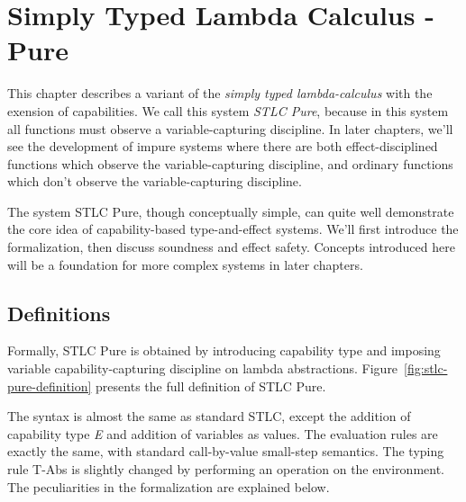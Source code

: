 \section{Simply Typed Lambda Calculus - Pure}

This chapter describes a variant of the \emph{simply typed
  lambda-calculus} with the exension of capabilities. We call this
system \emph{STLC Pure}, because in this system all functions must
observe a variable-capturing discipline.  In later chapters, we'll see
the development of impure systems where there are both
effect-disciplined functions which observe the variable-capturing
discipline, and ordinary functions which don't observe the
variable-capturing discipline.

The system STLC Pure, though conceptually simple, can quite well
demonstrate the core idea of capability-based type-and-effect
systems. We'll first introduce the formalization, then discuss
soundness and effect safety. Concepts introduced here will be a
foundation for more complex systems in later chapters.

\subsection{Definitions}

Formally, STLC Pure is obtained by introducing capability type and
imposing variable capability-capturing discipline on lambda
abstractions.  Figure~\ref{fig:stlc-pure-definition} presents the full
definition of STLC Pure.

The syntax is almost the same as standard STLC, except the addition of
capability type \emph{E} and addition of variables as values. The
evaluation rules are exactly the same, with standard call-by-value
small-step semantics. The typing rule T-Abs is slightly changed by
performing an operation on the environment. The peculiarities in the
formalization are explained below.

